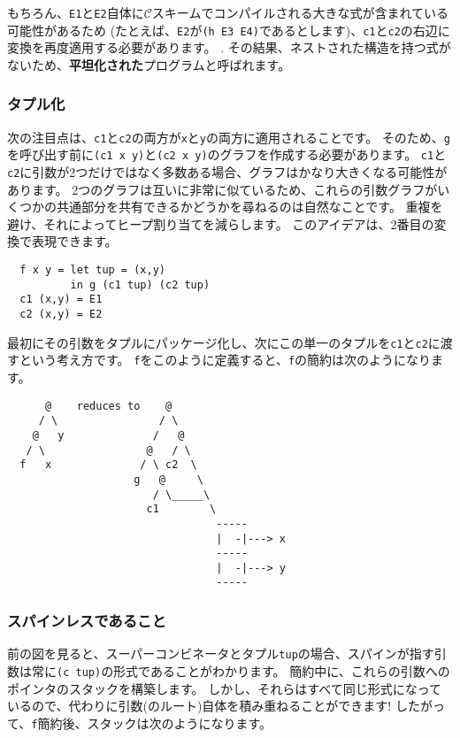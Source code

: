 \documentclass{jarticle}
\begin{document}
もちろん、\texttt{E1}と\texttt{E2}自体に$\mathcal{C}$スキームでコンパイルされる大きな式が含まれている可能性があるため
(たとえば、\texttt{E2}が\texttt{(h E3 E4)}であるとします)、\texttt{c1}と\texttt{c2}の右辺に変換を再度適用する必要があります。 .
その結果、ネストされた構造を持つ式がないため、\textbf{平坦化された}プログラムと呼ばれます。

\subsubsection{タプル化}

次の注目点は、\texttt{c1}と\texttt{c2}の両方が\texttt{x}と\texttt{y}の両方に適用されることです。
そのため、\texttt{g}を呼び出す前に\texttt{(c1 x y)}と\texttt{(c2 x y)}のグラフを作成する必要があります。
\texttt{c1}と\texttt{c2}に引数が2つだけではなく多数ある場合、グラフはかなり大きくなる可能性があります。
2つのグラフは互いに非常に似ているため、これらの引数グラフがいくつかの共通部分を共有できるかどうかを尋ねるのは自然なことです。
重複を避け、それによってヒープ割り当てを減らします。
このアイデアは、2番目の変換で表現できます。

\begin{verbatim}
  f x y = let tup = (x,y)
          in g (c1 tup) (c2 tup)
  c1 (x,y) = E1
  c2 (x,y) = E2
\end{verbatim}

最初にその引数をタプルにパッケージ化し、次にこの単一のタプルを\texttt{c1}と\texttt{c2}に渡すという考え方です。
\texttt{f}をこのように定義すると、\texttt{f}の簡約は次のようになります。

\begin{verbatim}
      @    reduces to    @
     / \                / \
    @   y              /   @
   / \                @   / \
  f   x              / \ c2  \
                    g   @     \
                       / \_____\
                      c1        \
                                 -----
                                 |  -|---> x
                                 -----
                                 |  -|---> y
                                 -----
\end{verbatim}

\subsubsection{スパインレスであること}

前の図を見ると、スーパーコンビネータとタプル\texttt{tup}の場合、スパインが指す引数は常に\texttt{(c tup)}の形式であることがわかります。
簡約中に、これらの引数へのポインタのスタックを構築します。
しかし、それらはすべて同じ形式になっているので、代わりに引数(のルート)自体を積み重ねることができます!
したがって、\texttt{f}簡約後、スタックは次のようになります。
\end{document}
